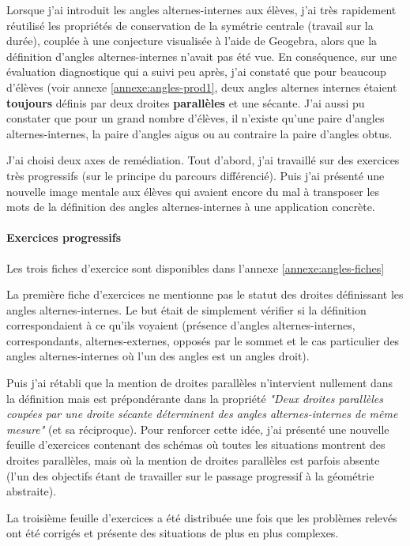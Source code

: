 Lorsque j'ai introduit les angles alternes-internes aux élèves, j'ai très rapidement réutilisé les propriétés de conservation de la symétrie centrale (travail sur la durée), couplée à une conjecture visualisée à l'aide de Geogebra, alors que la définition d'angles alternes-internes n'avait pas été vue. En conséquence, sur une évaluation diagnostique qui a suivi peu après, j'ai constaté que pour beaucoup d'élèves (voir annexe \ref{annexe:angles-prod1}, deux angles alternes internes étaient \textbf{toujours} définis par deux droites \textbf{parallèles} et une sécante. J'ai aussi pu constater que pour un grand nombre d'élèves, il n'existe qu'une paire d'angles alternes-internes, la paire d'angles aigus ou au contraire la paire d'angles obtus. 

J'ai choisi deux axes de remédiation. Tout d'abord, j'ai travaillé sur des exercices très progressifs (sur le principe du parcours différencié). Puis j'ai présenté une nouvelle image mentale aux élèves qui avaient encore du mal à transposer les mots de la définition des angles alternes-internes à une application concrète.

\paragraph{Exercices progressifs}

Les trois fiches d'exercice sont disponibles dans l'annexe \ref{annexe:angles-fiches}

La première fiche d'exercices ne mentionne pas le statut des droites définissant les angles alternes-internes. Le but était de simplement vérifier si la définition correspondaient à ce qu'ils voyaient (présence d'angles alternes-internes, correspondants, alternes-externes, opposés par le sommet et le cas particulier des angles alternes-internes où l'un des angles est un angles droit). 

Puis j'ai rétabli que la mention de droites parallèles n'intervient nullement dans la définition mais est prépondérante dans la propriété \textit{"Deux droites parallèles coupées par une droite sécante déterminent des angles alternes-internes de même mesure"} (et sa réciproque). Pour renforcer cette idée, j'ai présenté une nouvelle feuille d'exercices contenant des schémas où toutes les situations montrent des droites parallèles, mais où la mention de droites parallèles est parfois absente (l'un des objectifs étant de travailler sur le passage progressif à la géométrie abstraite).

La troisième feuille d'exercices a été distribuée une fois que les problèmes relevés ont été corrigés et présente des situations de plus en plus complexes.

